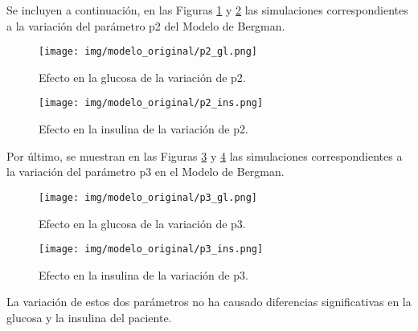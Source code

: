 Se incluyen a continuación, en las Figuras \ref{fig:p2_gluc} y \ref{fig:p2_ins} las simulaciones correspondientes a la variación del parámetro p2 del Modelo de Bergman.

\begin{figure}[htbp]
    \centering
    \texttt{[image: img/modelo\_original/p2\_gl.png]}
    \caption{Efecto en la glucosa de la variación de p2.}
    \label{fig:p2_gluc}
\end{figure}
\begin{figure}[htbp]
    \centering
    \texttt{[image: img/modelo\_original/p2\_ins.png]}
    \caption{Efecto en la insulina de la variación de p2.}
    \label{fig:p2_ins}
\end{figure}
\clearpage
Por último, se muestran en las Figuras \ref{fig:p3_gluc} y \ref{fig:p3_ins} las simulaciones correspondientes a la variación del parámetro p3 en el Modelo de Bergman.

\begin{figure}[htbp]
    \centering
    \texttt{[image: img/modelo\_original/p3\_gl.png]}
    \caption{Efecto en la glucosa de la variación de p3.}
    \label{fig:p3_gluc}
\end{figure}
\begin{figure}[htbp]
    \centering
    \texttt{[image: img/modelo\_original/p3\_ins.png]}
    \caption{Efecto en la insulina de la variación de p3.}
    \label{fig:p3_ins}
\end{figure}

La variación de estos dos parámetros no ha causado diferencias significativas en la glucosa y la insulina del paciente.